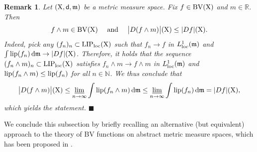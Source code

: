 \documentclass[reqno]{amsart}
\numberwithin{equation}{section}
\newcommand{\N}{\mathbb{N}}
\newcommand{\R}{\mathbb{R}}
\newcommand{\X}{{\rm X}}
\newcommand{\sfd}{{\sf d}}
\newcommand{\mm}{\mathfrak m}
\renewcommand{\d}{{\mathrm d}}
\newcommand{\1}{\mathbbm 1}
\newcommand{\limi}{\varliminf}
\newcommand{\LIP}{{\rm LIP}}
\newcommand{\lip}{{\rm lip}}
\newcommand{\loc}{{\rm loc}}
\newcommand{\BV}{{\rm BV}}
\newcommand{\fr}{\penalty-20\null\hfill\(\blacksquare\)}
\newtheorem{remark}[theorem]{Remark}
\begin{document}
%
%
\begin{remark}\label{rmk:BV_lattice}{\rm
Let \((\X,\sfd,\mm)\) be a metric measure space.
Fix \(f\in\BV(\X)\) and \(m\in\R\). Then
\begin{equation}\label{eq:BV_lattice}
f\wedge m\in\BV(\X)\quad\text{ and }\quad\big|D(f\wedge m)\big|(\X)\leq|Df|(\X).
\end{equation}
Indeed, pick any \((f_n)_n\subset\LIP_\loc(\X)\) such that \(f_n\to f\) in
\(L^1_\loc(\mm)\) and \(\int\lip(f_n)\,\d\mm\to|Df|(\X)\). Therefore, it holds that the
sequence \((f_n\wedge m)_n\subset\LIP_\loc(\X)\) satisfies \(f_n\wedge m\to f\wedge m\)
in \(L^1_\loc(\mm)\) and \(\lip(f_n\wedge m)\leq\lip(f_n)\) for all \(n\in\N\).
We thus conclude that
\[
\big|D(f\wedge m)\big|(\X)\leq\limi_{n\to\infty}\int\lip(f_n\wedge m)\,\d\mm
\leq\limi_{n\to\infty}\int\lip(f_n)\,\d\mm=|Df|(\X),
\]
which yields the statement.
\fr}\end{remark}
%
%
We conclude this subsection by briefly recalling an alternative (but equivalent)
approach to the theory of BV functions on abstract metric measure spaces,
which has been proposed in \cite{DiMarinoPhD,DiMarino14}. 
\medskip
\end{document}

